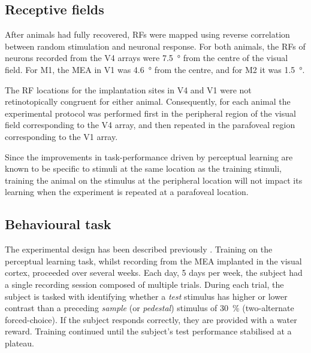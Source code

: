 \subsection{Receptive fields}

After animals had fully recovered, \acp{RF} were mapped using reverse correlation between random stimulation and neuronal response.
For both animals, the \acp{RF} of neurons recorded from the \ac{V4} arrays were \SI{7.5}{\degree} from the centre of the visual field.
For \ac{M1}, the \ac{MEA} in \ac{V1} was \SI{4.6}{\degree} from the centre, and for \ac{M2} it was \SI{1.5}{\degree}.

The \ac{RF} locations for the implantation sites in \ac{V4} and \ac{V1} were not retinotopically congruent for either animal.
Consequently, for each animal the experimental protocol was performed first in the peripheral region of the visual field corresponding to the \ac{V4} array, and then repeated in the parafoveal region corresponding to the \ac{V1} array.

Since the improvements in task-performance driven by perceptual learning are known to be specific to stimuli at the same location as the training stimuli, training the animal on the stimulus at the peripheral location will not impact its learning when the experiment is repeated at a parafoveal location.


\subsection{Behavioural task}

The experimental design has been described previously \citep[see][]{Chen2013}.
Training on the perceptual learning task, whilst recording from the \ac{MEA} implanted in the visual cortex, proceeded over several weeks.
Each day, 5 days per week, the subject had a single recording session composed of multiple trials.
During each trial, the subject is tasked with identifying whether a \textit{test} stimulus has higher or lower contrast than a preceding \textit{sample} (or \textit{pedestal}) stimulus of \SI{30}{\percent} (two-alternate forced-choice).
If the subject responds correctly, they are provided with a water reward.
Training continued until the subject's test performance stabilised at a plateau.

